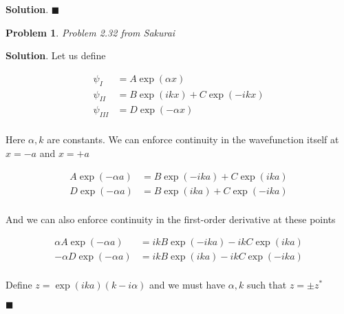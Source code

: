 \documentclass[12pt]{article}
\newtheorem{p}{Problem}
\theoremstyle{definition}
\newenvironment{s}{%
        \begin{trivlist} \item \textbf{Solution}. }{%
            \hspace*{\fill} $\blacksquare$\end{trivlist}}%
\begin{document}
{\begin{s}
\end{s}

\begin{p}
Problem 2.32 from Sakurai
\end{p}

\begin{s}
Let us define 

\begin{align*}
\psi_{I} &= A\exp(\alpha x)\\
\psi_{II} &= B\exp(ikx) + C\exp(-ikx)\\
\psi_{III} &= D\exp(-\alpha x)\\
\end{align*}

Here $\alpha,k$ are constants. We can enforce continuity in the wavefunction itself at $x = -a$ and $x=+a$

\begin{align*}
A\exp(-\alpha a) &= B\exp(-ika) + C\exp(ika)\\
D\exp(-\alpha a) &= B\exp(ika) + C\exp(-ika)\\
\end{align*}

And we can also enforce continuity in the first-order derivative at these points

\begin{align*}
\alpha A\exp(-\alpha a) &= ikB\exp(-ika) -ikC\exp(ika)\\
-\alpha D\exp(-\alpha a) &= ikB\exp(ika) -ikC\exp(-ika)\\
\end{align*}

Define $z = \exp(ika)(k-i\alpha)$ and we must have $\alpha,k$ such that $z = \pm z^{*}$

\end{s}
\end{document}
